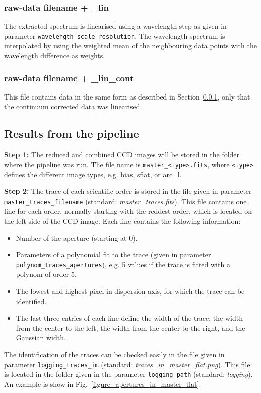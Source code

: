 \documentclass[10pt,a4paper]{article}
\begin{document}
\subsubsection{raw-data filename + \_lin}
\label{Section:linearised_spectrum}
The extracted spectrum is linearised using a wavelength step as given in parameter \verb|wavelength_scale_resolution|. The wavelength spectrum is interpolated by using the weighted mean of the neighbouring data points with the wavelength difference as weights.

\subsubsection{raw-data filename + \_lin\_cont}
This file contains data in the same form as described in Section~\ref{Section:linearised_spectrum}, only that the continuum corrected data was linearised.

\subsection{Results from the pipeline}
\label{section:results_pipeline}

\noindent \textbf{Step 1:} The reduced and combined CCD images will be stored in the folder where the pipeline was run. The file name is \verb|master_<type>.fits|, where \verb|<type>| defines the different image types, e.g. bias, sflat, or arc\_l.

\vspace{0.5em}\noindent \textbf{Step 2:} The trace of each scientific order is stored in the file given in parameter \verb|master_traces_filename| (standard: \textit{master\_traces.fits}). This file contains one line for each order, normally starting with the reddest order, which is located on the left side of the CCD image. Each line contains the following information:
\begin{itemize}\setlength\itemsep{0em}
  \item Number of the aperture (starting at 0).
  \item Parameters of a polynomial fit to the trace (given in parameter \verb|polynom_traces_apertures|), e.g. 5 values if the trace is fitted with a polynom of order 5.
  \item The lowest and highest pixel in dispersion axis, for which the trace can be identified.
  \item The last three entries of each line define the width of the trace: the width from the center to the left, the width from the center to the right, and the Gaussian width.
\end{itemize}
The identification of the traces can be checked easily in the file given in parameter \verb|logging_traces_im| (standard: \textit{traces\_in\_master\_flat.png}). This file is located in the folder given in the parameter \verb|logging_path| (standard: \textit{logging}). An example is show in Fig.~\ref{figure_apertures_in_master_flat}.
\end{document}
